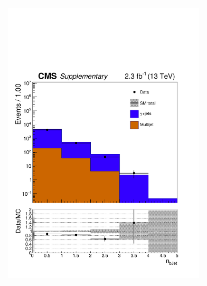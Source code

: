 \begin{figure}[tbhp]
\begin{center}
     \includegraphics[width=0.45\textwidth]{figures/SinglePhoton_nBJet40_all_all} \\
  \end{center}
\end{figure}


